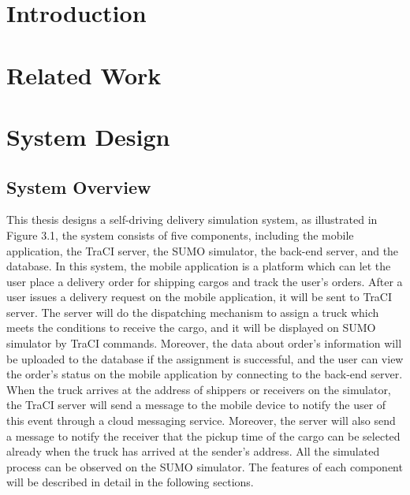 \documentclass[12pt]{ksthesis}
\begin{document}
\begin{thesis}\large {
\chapter{Introduction} \label{Chap:Introduction}



  


\chapter{Related Work} \label{Chap:Related}




\chapter{System Design}\label{Chap:Architecture}

\section{System Overview}



This thesis designs a self-driving delivery simulation system, as illustrated in Figure 3.1, the system consists of five components, including the mobile application, the TraCI server, the SUMO simulator, the back-end server, and the database. In this system, the mobile application is a platform which can let the user place a delivery order for shipping cargos and track the user’s orders. After a user issues a delivery request on the mobile application, it will be sent to TraCI server. The server will do the dispatching mechanism to assign a truck which meets the conditions to receive the cargo, and it will be displayed on SUMO simulator by TraCI commands. Moreover, the data about order’s information will be uploaded to the database if the assignment is successful, and the user can view the order’s status on the mobile application by connecting to the back-end server. When the truck arrives at the address of shippers or receivers on the simulator, the TraCI server will send a message to the mobile device to notify the user of this event through a cloud messaging service. Moreover, the server will also send a message to notify the receiver that the pickup time of the cargo can be selected already when the truck has arrived at the sender’s address. All the simulated process can be observed on the SUMO simulator. The features of each component will be described in detail in the following sections.

}
\end{thesis}
\end{document}

